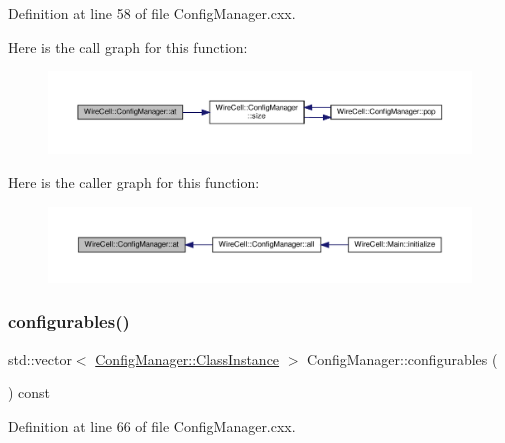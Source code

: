 Definition at line 58 of file Config\+Manager.\+cxx.

Here is the call graph for this function\+:
\nopagebreak
\begin{figure}[H]
\begin{center}
\leavevmode
\includegraphics[width=350pt]{class_wire_cell_1_1_config_manager_a598ade80af4432ce25beac1d2ba3028e_cgraph}
\end{center}
\end{figure}
Here is the caller graph for this function\+:
\nopagebreak
\begin{figure}[H]
\begin{center}
\leavevmode
\includegraphics[width=350pt]{class_wire_cell_1_1_config_manager_a598ade80af4432ce25beac1d2ba3028e_icgraph}
\end{center}
\end{figure}
\mbox{\label{class_wire_cell_1_1_config_manager_a7981627a4327f308bc3008337c39db07}} 
\subsubsection{\texorpdfstring{configurables()}{configurables()}}
{\footnotesize\ttfamily std\+::vector$<$ \hyperlink{class_wire_cell_1_1_config_manager_adffbbcadcf6c79655c6809b9155184cb}{Config\+Manager\+::\+Class\+Instance} $>$ Config\+Manager\+::configurables (\begin{DoxyParamCaption}{ }\end{DoxyParamCaption}) const}



Definition at line 66 of file Config\+Manager.\+cxx.

\mbox{\label{class_wire_cell_1_1_config_manager_abd465f55ebf6135f5e24b5074020fa36}} 
